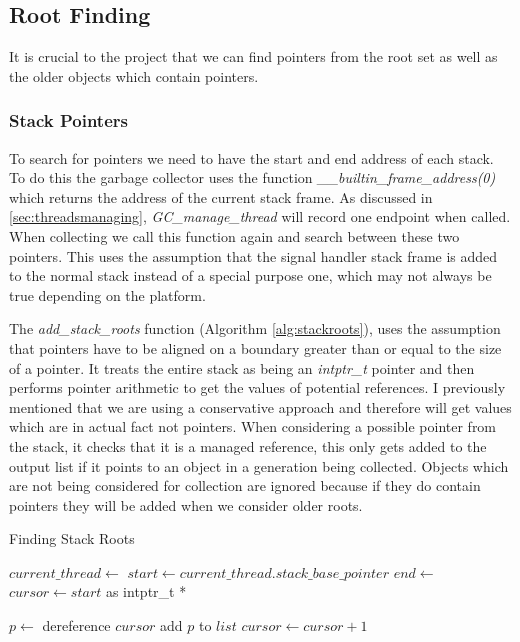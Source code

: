 \documentclass[../diss.tex]{subfiles}
\begin{document}
\subsection{Root Finding}

It is crucial to the project that we can find pointers from the root set as well as the older objects which contain pointers. 

\subsubsection{Stack Pointers}
\label{sec:stackroots}
To search for pointers we need to have the start and end address of each stack. To do this the garbage collector uses the function \emph{\_\_builtin\_frame\_address(0)} which returns the address of the current stack frame. As discussed in \cref{sec:threadsmanaging}, \emph{GC\_manage\_thread} will record one endpoint when called. When collecting we call this function again and search between these two pointers. This uses the assumption that the signal handler stack frame is added to the normal stack instead of a special purpose one, which may not always be true depending on the platform.

The \emph{add\_stack\_roots} function (Algorithm \ref{alg:stackroots}), uses the assumption that pointers have to be aligned on a boundary greater than or equal to the size of a pointer. It treats the entire stack as being an \emph{intptr\_t} pointer and then performs pointer arithmetic to get the values of potential references. I previously mentioned that we are using a conservative approach and therefore will get values which are in actual fact not pointers. When considering a possible pointer from the stack, it checks that it is a managed reference, this only gets added to the output list if it points to an object in a generation being collected. Objects which are not being considered for collection are ignored because if they do contain pointers they will be added when we consider older roots.

\begin{algorithm}
\caption{Finding Stack Roots}
\label{alg:stackroots}
\begin{algorithmic}


\State $current\_thread\gets $ 
\State $start\gets current\_thread.stack\_base\_pointer$
\State $end\gets $ 
\State $cursor\gets start$ as intptr\_t * 

    \State $p\gets$ dereference $cursor$
            \State add $p$ to $list$
        \EndIf
    \EndIf
    \State $cursor\gets cursor+1$
\EndWhile

\EndFunction

\end{algorithmic}
\end{algorithm}
\end{document}
